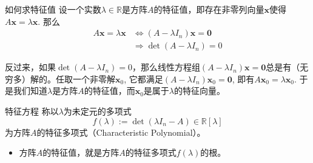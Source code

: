 \documentclass[10pt]{beamer}
\begin{document}

\begin{frame}

\begin{block}{如何求特征值}
设一个实数$\lambda\in\mathbb{R}$是方阵$A$的特征值，即存在非零列向量$\mathbf{x}$使得$A\mathbf{x} = \lambda\mathbf{x}$. 那么
\begin{align*}
A\mathbf{x} = \lambda\mathbf{x} & \Longleftrightarrow (A - \lambda I_n) \mathbf{x} = \mathbf{0} \\
& \Longrightarrow \det (A - \lambda I_n) = 0
\end{align*}

\pause

反过来，如果$\det (A - \lambda I_n) = 0$，那么线性方程组$(A - \lambda I_n) \mathbf{x} = \mathbf{0}$总是有（无穷多）解的。任取一个非零解$\mathbf{x}_0$, 它都满足$(A - \lambda I_n) \mathbf{x}_0 = \mathbf{0}$, 即有$A\mathbf{x}_0 = \lambda\mathbf{x}_0$. 于是我们知道$\lambda$是方阵$A$的特征值，而$\mathbf{x}_0$是属于$\lambda$的特征向量。
\end{block}

\end{frame}


\begin{frame}

\begin{block}{特征方程}
称以$\lambda$为未定元的多项式
$$f(\lambda) := \det(\lambda I_n - A) \in \mathbb{R}[\lambda]$$
为方阵$A$的特征多项式（Characteristic Polynomial）。

\vspace{2em}
\pause

\begin{itemize}
\item 方阵$A$的特征值，就是方阵$A$的特征多项式$f(\lambda)$的根。
\end{itemize}
\end{block}

\end{frame}

\end{document}
